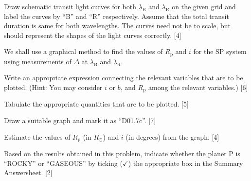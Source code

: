 \begin{description}
  Draw schematic transit light curves for both $\lambda_{\mathrm{B}}$ and
  $\lambda_{\mathrm{R}}$ on the given grid and label the curves by ``B'' and
  ``R'' respectively. Assume that the total transit duration is same for both
  wavelengths. The curves need not be to scale, but should represent the
  shapes of the light curves correctly. \hfill[4]
\item[(D01.7)] We shall use a graphical method to find the values of
  $R_{\mathrm{p}}$ and $i$ for the SP system using measurements of $\Delta$ at
  $\lambda_{\mathrm{B}}$ and $\lambda_{\mathrm{R}}$.
\item[(D01.7a)] Write an appropriate expression connecting the relevant
  variables that are to be plotted. (Hint: You may consider $i$ or $b$, and
  $R_{\mathrm{p}}$ among the relevant variables.) \hfill[6]
\item[(D01.7b)] Tabulate the appropriate quantities that are to be
  plotted. \hfill[5]
\item[(D01.7c)] Draw a suitable graph and mark it as ``D01.7c''. \hfill[7]
\item[(D01.7d)] Estimate the values of $R_{\mathrm{p}}$ (in $R_\odot$) and $i$
  (in degrees) from the graph. \hfill[4]
\item[(D01.8)] Based on the results obtained in this problem, indicate whether
  the planet P is ``ROCKY'' or ``GASEOUS'' by ticking ($\checkmark$) the
  appropriate box in the Summary Answersheet. \hfill[2]
\end{description}
